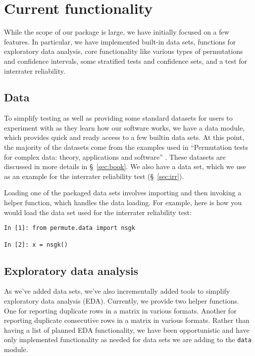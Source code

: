 \chapter{\label{ch:func}Current functionality}

While the scope of our package is large, we have initially focused on a
few features.  In particular, we have implemented built-in data sets,
functions for exploratory data analysis, core functionality like various
types of permutations and confidence intervals, some stratified tests
and confidence sets, and a test for interrater reliability.

\section{Data}

To simplify testing as well as providing some standard datasets for
users to experiment with as they learn how our software works, we
have a data module, which provides quick and ready access to a few
builtin data sets. At this point, the majority of the datasets come
from the examples used in ``Permutation tests for complex data: theory,
applications and software'' \cite{pesarin2010permutation}.  These
datasets are discussed in more details in \S~\ref{sec:book}.  We also
have a data set, which we use as an example for the interrater
reliability test (\S~\ref{sec:irr}).

Loading one of the packaged data sets involves importing and then
invoking a helper function, which handles the data loading.  For
example, here is how you would load the data set used for the
interrater reliability test:
\begin{verbatim}
In [1]: from permute.data import nsgk

In [2]: x = nsgk()
\end{verbatim} 

\section{Exploratory data analysis}

As we've added data sets, we've also incrementally added tools to simplify
exploratory data analysis (EDA).  Currently, we provide two helper functions.
One for reporting duplicate rows in a matrix in various formats.  Another for
reporting duplicate consecutive rows in a matrix in various formats.  Rather
than having a list of planned EDA functionality, we have been opportunistic
and have only implemented functionality as needed for data sets we are adding
to the \texttt{data} module.

